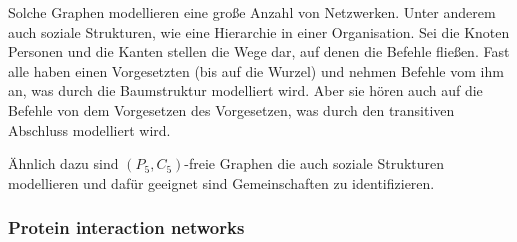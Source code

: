 \documentclass[12pt,a4paper,onecolumn,oneside,titlepage]{article}
\begin{document}
Solche Graphen modellieren eine große Anzahl von Netzwerken. Unter anderem auch soziale Strukturen, wie eine Hierarchie in einer Organisation. Sei die Knoten Personen und die Kanten stellen die Wege dar, auf denen die Befehle fließen. Fast alle haben einen Vorgesetzten (bis auf die Wurzel) und nehmen Befehle vom ihm an, was durch die Baumstruktur modelliert wird. Aber sie hören auch auf die Befehle von dem Vorgesetzen des Vorgesetzen, was durch den transitiven Abschluss modelliert wird. \cite{NastosG13}




Ähnlich dazu sind $(P_5,C_5)$-freie Graphen die auch soziale Strukturen modellieren und dafür geeignet sind Gemeinschaften zu identifizieren. \cite{Schoch15}

\subsubsection{Protein interaction networks}
\end{document}

